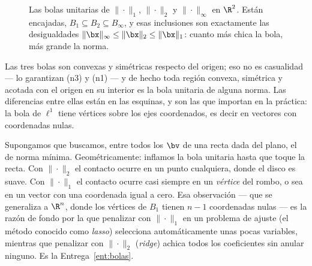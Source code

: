 \begin{figure}[htbp]
\centering
{}
\caption{Las bolas unitarias de $\|\cdot\|_1$, $\|\cdot\|_2$ y
$\|\cdot\|_\infty$ en $\R^2$. Están encajadas,
$B_1\subseteq B_2\subseteq B_\infty$, y esas inclusiones son exactamente las
desigualdades $\|\bx\|_\infty\le\|\bx\|_2\le\|\bx\|_1$: cuanto más chica la
bola, más grande la norma.}
\label{fig:bolas}
\end{figure}

Las tres bolas son convexas y simétricas respecto del origen; eso no es
casualidad --- lo garantizan (n3) y (n1) --- y de hecho toda región convexa,
simétrica y acotada con el origen en su interior es la bola unitaria de
alguna norma. Las diferencias entre ellas están en las esquinas, y son las
que importan en la práctica: la bola de $\ell^1$ tiene vértices sobre los
ejes coordenados, es decir en vectores con coordenadas nulas.

\begin{remark}
\label{obs:ralas}
Supongamos que buscamos, entre todos los $\bv$ de una recta dada del plano,
el de norma mínima. Geométricamente: inflamos la bola unitaria hasta que
toque la recta. Con $\|\cdot\|_2$ el contacto ocurre en un punto cualquiera,
donde el disco es suave. Con $\|\cdot\|_1$ el contacto ocurre casi siempre en
un \emph{vértice} del rombo, o sea en un vector con una coordenada igual a
cero. Esa observación --- que se generaliza a $\R^n$, donde los vértices de
$B_1$ tienen $n-1$ coordenadas nulas --- es la razón de fondo por la que
penalizar con $\|\cdot\|_1$ en un problema de ajuste (el método conocido como
\emph{lasso}) selecciona automáticamente unas pocas variables, mientras que
penalizar con $\|\cdot\|_2$ (\emph{ridge}) achica todos los coeficientes sin
anular ninguno. Es la Entrega~\ref{ent:bolas}.
\end{remark}

